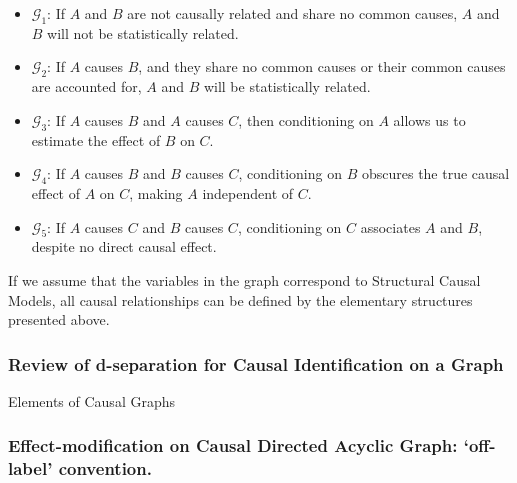 \documentclass[
  single column]{article}
\providecommand{\tightlist}{%
  \setlength{\itemsep}{0pt}\setlength{\parskip}{0pt}}\usepackage{longtable,booktabs,array}
\begin{document}
\begin{itemize}
\tightlist
\item
  \textbf{\(\mathcal{G}_1\)}: If \(A\) and \(B\) are not causally
  related and share no common causes, \(A\) and \(B\) will not be
  statistically related.
\item
  \textbf{\(\mathcal{G}_2\)}: If \(A\) causes \(B\), and they share no
  common causes or their common causes are accounted for, \(A\) and
  \(B\) will be statistically related.
\item
  \textbf{\(\mathcal{G}_3\)}: If \(A\) causes \(B\) and \(A\) causes
  \(C\), then conditioning on \(A\) allows us to estimate the effect of
  \(B\) on \(C\).
\item
  \textbf{\(\mathcal{G}_4\)}: If \(A\) causes \(B\) and \(B\) causes
  \(C\), conditioning on \(B\) obscures the true causal effect of \(A\)
  on \(C\), making \(A\) independent of \(C\).
\item
  \textbf{\(\mathcal{G}_5\)}: If \(A\) causes \(C\) and \(B\) causes
  \(C\), conditioning on \(C\) associates \(A\) and \(B\), despite no
  direct causal effect.
\end{itemize}

If we assume that the variables in the graph correspond to Structural
Causal Models, all causal relationships can be defined by the elementary
structures presented above.

\subsubsection{Review of d-separation for Causal Identification on a
Graph}\label{review-of-d-separation-for-causal-identification-on-a-graph}

\begin{table}

\caption{\label{tbl-terminologygeneral}Elements of Causal Graphs}

\centering{

\terminologydirectedgraph

}

\end{table}%

\subsubsection{Effect-modification on Causal Directed Acyclic Graph:
`off-label'
convention.}\label{effect-modification-on-causal-directed-acyclic-graph-off-label-convention.}
\end{document}
